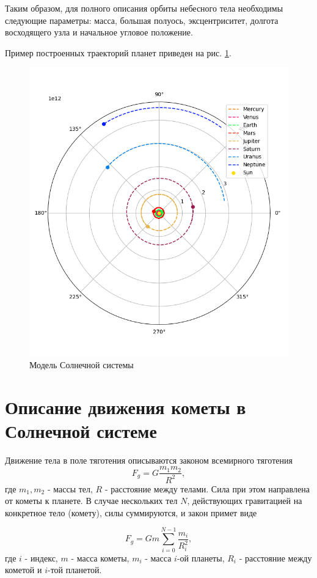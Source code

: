 Таким образом, для полного описания орбиты небесного тела необходимы следующие параметры:
масса, большая полуось, эксцентриситет, долгота восходящего узла и начальное угловое положение.

Пример построенных траекторий планет приведен на рис. \ref{fig:system}.
\begin{figure}[h!]
	\centering
	\includegraphics[width=0.5\linewidth]{imgs_8/solar.png}
	\caption{Модель Солнечной системы}
    \label{fig:system}
\end{figure}


\section{Описание движения кометы в Солнечной системе}
Движение тела в поле тяготения описываются законом всемирного тяготения
\begin{equation}
	F_g = G\frac{m_1 m_2}{R^2},
\end{equation}
где $m_1, m_2$ - массы тел, $R$ - расстояние между телами. Сила при этом направлена от кометы к планете.
В случае нескольких тел $N$, действующих
гравитацией на конкретное тело (комету), силы суммируются, и закон примет виде

\begin{equation}
	F_g = G m \sum_{i=0}^{N-1}\frac{m_i}{R_i^2},
\end{equation}
где $i$ - индекс, $m$ - масса кометы, $m_i$ - масса $i$-ой планеты, $R_i$ - расстояние между
кометой и $i$-той планетой.

